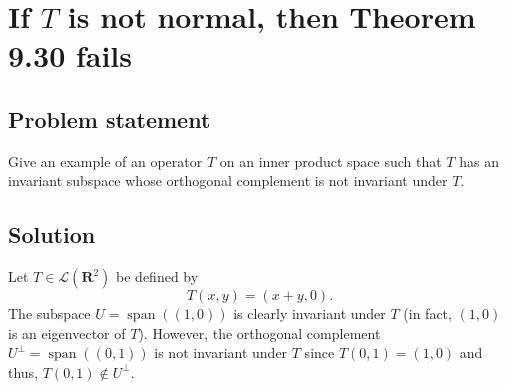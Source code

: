 \documentclass{article}
\begin{document}
\clearpage

\section{If $T$ is not normal, then Theorem 9.30 fails}
\subsection*{Problem statement}
Give an example of an operator $T$ on an inner product space such that $T$ has an invariant subspace whose orthogonal complement is not invariant under $T$.

\subsection*{Solution}
Let $T\in\mathcal{L}(\textbf{R}^2)$ be defined by 
\[T(x,y)=(x+y,0).\]
The subspace $U=\operatorname{span}((1,0))$ is clearly invariant under $T$ (in fact, $(1,0)$ is an eigenvector of $T$). 
However, the orthogonal complement $U^\bot=\operatorname{span}((0,1))$ is not invariant under $T$ since $T(0,1)=(1,0)$ and thus, $T(0,1)\notin U^\bot$.
\end{document}

